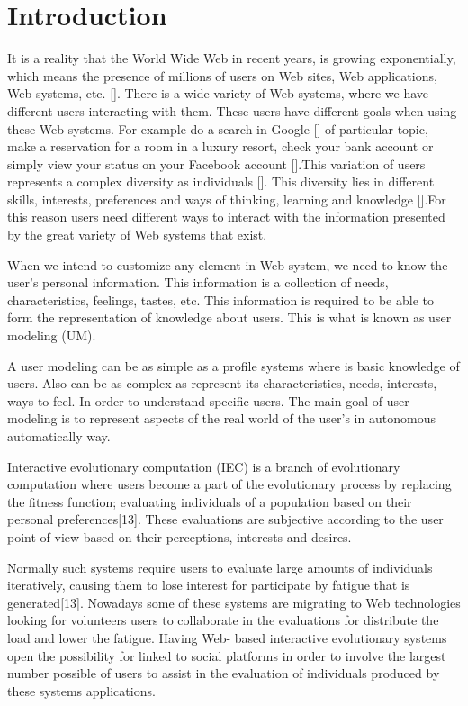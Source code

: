 \chapter{Introduction} \label{introduction} 


\par It is a reality that the World Wide Web in recent years, is growing
exponentially, which means the presence of millions of users on Web sites, Web
applications, Web systems, etc. []. There is a wide variety of Web systems,
where we have different users interacting with them. These users have different
goals when using these Web systems. For example do a search in Google [] of
particular topic, make a reservation for a room in a luxury resort, check your
bank account or simply view your status on your Facebook account [].This
variation of users represents a complex diversity as individuals []. This
diversity lies in different skills, interests, preferences and ways of thinking,
learning and knowledge [].For this reason users need different ways to interact
with the information presented by the great variety of Web systems that exist.
\par When we intend to customize any element in Web system, we need to
know the user's personal information. This information is a collection of needs,
characteristics, feelings, tastes, etc. This information is required to be able
to form the representation of knowledge about users. This is what is known as
user modeling (UM).  
\par A user modeling can be as simple as a profile
systems where is basic knowledge of users. Also  can be as complex as represent
its characteristics, needs, interests, ways to feel. In order to understand
specific users. The main goal of user modeling is to represent aspects of the
real world of the user's in  autonomous automatically way.  

\par Interactive evolutionary computation (IEC)
is a branch of evolutionary computation where users become a part of the
evolutionary process by replacing the fitness function; evaluating individuals
of a population based on their personal preferences[13]. These evaluations are
subjective according to the user point of view based on their perceptions,
interests and desires.  
\par Normally such systems require users to evaluate large amounts of individuals 
iteratively, causing them to lose interest for participate by fatigue that 
is generated[13]. Nowadays some of these systems
are migrating to  Web technologies looking for volunteers users to collaborate
in the evaluations for distribute the load and lower the fatigue. Having Web-
based interactive evolutionary systems open the possibility for linked to social
platforms in order to involve the largest number possible of users to assist in
the evaluation of individuals produced by these systems applications.


